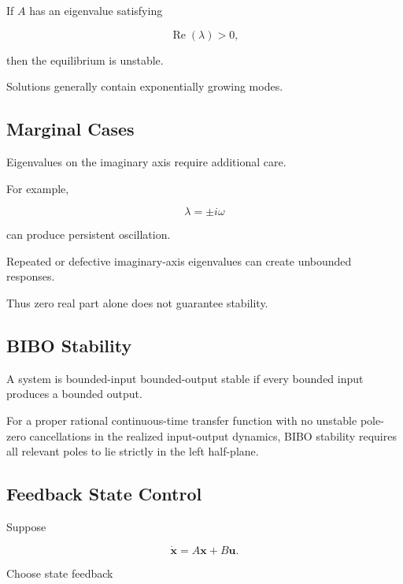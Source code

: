 If \(A\) has an eigenvalue satisfying

\[
\boxed{
\operatorname{Re}(\lambda)>0,
}
\]

then the equilibrium is unstable.

Solutions generally contain exponentially growing modes.

\subsection{Marginal Cases}
\label{subsec:marginal-stability-control}

Eigenvalues on the imaginary axis require additional care.

For example,

\[
\lambda=\pm i\omega
\]

can produce persistent oscillation.

Repeated or defective imaginary-axis eigenvalues can create unbounded
responses.

Thus zero real part alone does not guarantee stability.

\subsection{BIBO Stability}
\label{subsec:bibo-stability}

A system is bounded-input bounded-output stable if every bounded input
produces a bounded output.

For a proper rational continuous-time transfer function with no unstable
pole-zero cancellations in the realized input-output dynamics, BIBO
stability requires all relevant poles to lie strictly in the left half-plane.

\subsection{Feedback State Control}
\label{subsec:state-feedback-control}

Suppose

\[
\dot{\mathbf{x}}
=
A\mathbf{x}
+
B\mathbf{u}.
\]

Choose state feedback

